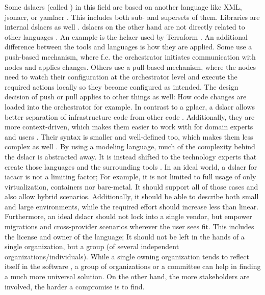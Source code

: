 \newline
Some \gls{dslacr}s (called ) in this field are based on another language like XML, \gls{jsonacr}, or \gls{yamlacr} \cite{iac_oreilly}. This includes both sub- and supersets of them. Libraries are internal \gls{dslacr}s as well \cite{dsl_oreilly}.  \gls{dslacr}s on the other hand are not directly related to other languages \cite{dsl_oreilly}. An example is the \gls{hclacr} used by Terraform \cite{iac_oreilly} \cite{dsl_oreilly}.
\newline
An additional difference between the tools and languages is how they are applied. Some use a push-based mechanism, where f.e. the orchestrator initiates communication with nodes and applies changes. Others use a pull-based mechanism, where the nodes need to watch their configuration at the orchestrator level and execute the required actions locally so they become configured as intended. The design decision of push or pull applies to other things as well: How code changes are loaded into the orchestrator for example.
\newline
In contrast to a \gls{gplacr}, a \gls{dslacr} allows better separation of infrastructure code from other code \cite{dsl_slides}. Additionally, they are more context-driven, which makes them easier to work with for domain experts and users \cite{dsl_oreilly}. Their syntax is smaller and well-defined too, which makes them less complex as well \cite{dsl_oreilly}.
\newline
By using a modeling language, much of the complexity behind the \gls{dslacr} is abstracted away. It is instead shifted to the technology experts that create those languages and the surrounding tools \cite{dsl_oreilly}.
\newline
In an ideal world, a \gls{dslacr} for \gls{iacacr} is not a limiting factor; For example, it is not limited to full usage of only virtualization, containers nor bare-metal. It should support all of those cases and also allow hybrid scenarios. Additionally, it should be able to describe both small and large environments, while the required effort should increase less than linear. Furthermore, an ideal \gls{dslacr} should not lock into a single vendor, but empower migrations and cross-provider scenarios wherever the user sees fit. This includes the license and owner of the language; It should not be left in the hands of a single organization, but a group (of several independent organizations/individuals). While a single owning organization tends to reflect itself in the software \cite{conways_law}, a group of organizations or a committee can help in finding a much more universal solution. On the other hand, the more stakeholders are involved, the harder a compromise is to find.
